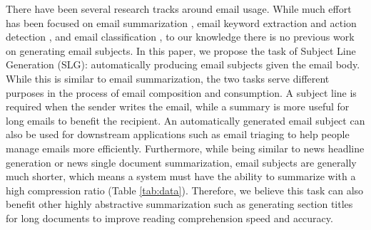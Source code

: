 \documentclass[11pt,a4paper]{article}
\begin{document}
\begin{table}[t!]
\centering
{}
\caption{An email with three possible subject lines.
}
\vspace{-4mm}
\label{tab:example}
\end{table} 
There have been several research tracks around email usage.
 While much effort has been focused on email summarization \cite{muresan2001combining,nenkova2003facilitating,rambow2004summarizing}, email keyword extraction and action detection \cite{turney2000learning,lahiri2017keyword,lin2018actionable}, and email classification \cite{prabhakaran2014predicting,alkhereyf2017work}, to our knowledge there is no previous work on generating email subjects.
In this paper, we propose the task of Subject Line Generation (SLG): automatically producing email subjects given the email body.
While this is similar to email summarization, the two tasks serve different purposes in the process of email composition and consumption.
A subject line is required when the sender writes the email, while a summary is more useful for long emails to benefit the recipient.
An automatically generated email subject can also be used for downstream applications such as email triaging to help people manage emails more efficiently.
Furthermore, while being similar to news headline generation or news single document summarization, email subjects are generally much shorter, which means a system must have the ability to summarize with a high compression ratio (Table \ref{tab:data}).
Therefore, we believe this task can also benefit other highly abstractive summarization such as generating section titles for long documents to improve reading comprehension speed and accuracy.
\end{document}
